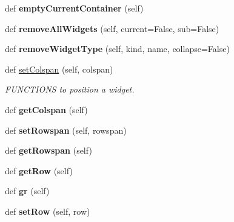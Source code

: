 \begin{DoxyCompactItemize}
\mbox{\label{classappjar_1_1gui_aced6d521f5ffb482e862107d0f36563f}} 
def {\bfseries empty\+Current\+Container} (self)
\item 
\mbox{\label{classappjar_1_1gui_a87f7291bd97eed3453a58b9d38920f6f}} 
def {\bfseries remove\+All\+Widgets} (self, current=False, sub=False)
\item 
\mbox{\label{classappjar_1_1gui_aa2ab4ee05a4fcd86391ad4a95c7d9dfe}} 
def {\bfseries remove\+Widget\+Type} (self, kind, name, collapse=False)
\item 
\mbox{\label{classappjar_1_1gui_aaf0627ebbeda2d9bcb111c3aeab37f6e}} 
def \hyperlink{classappjar_1_1gui_aaf0627ebbeda2d9bcb111c3aeab37f6e}{set\+Colspan} (self, colspan)
\begin{DoxyCompactList}\small\item\em F\+U\+N\+C\+T\+I\+O\+NS to position a widget. \end{DoxyCompactList}\item 
\mbox{\label{classappjar_1_1gui_ab23c6622df3a34957159966ff51c40ce}} 
def {\bfseries get\+Colspan} (self)
\item 
\mbox{\label{classappjar_1_1gui_a4a2d8baba0be8e0aebd2c1ed2c555286}} 
def {\bfseries set\+Rowspan} (self, rowspan)
\item 
\mbox{\label{classappjar_1_1gui_a8b80fbb4dd9f32a0b03d577d243f1fbc}} 
def {\bfseries get\+Rowspan} (self)
\item 
\mbox{\label{classappjar_1_1gui_acd5a20639439efebad25a2a12f5e3455}} 
def {\bfseries get\+Row} (self)
\item 
\mbox{\label{classappjar_1_1gui_a464ef46822c26ba2f022d84cf41a64fd}} 
def {\bfseries gr} (self)
\item 
\mbox{\label{classappjar_1_1gui_a8b3ac4510e7189fd8dbb629f069f88a4}} 
def {\bfseries set\+Row} (self, row)
\item 
\mbox{\label{classappjar_1_1gui_a25ae21bee85e6cb481a4e7de78b428df}} 

\end{DoxyCompactItemize}
